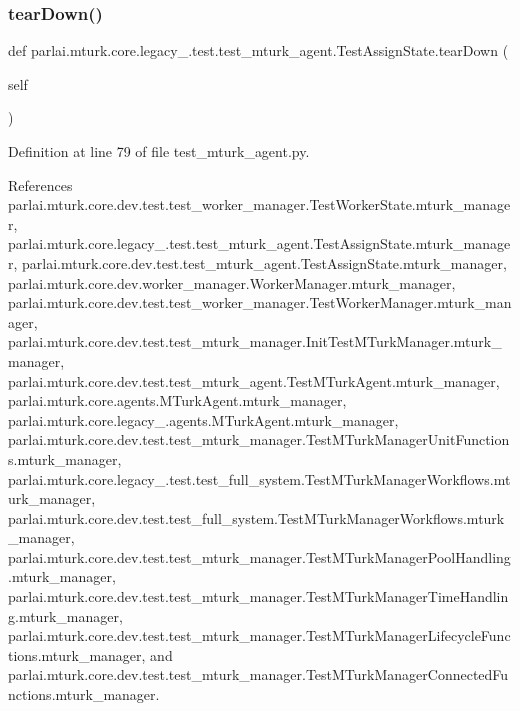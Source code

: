 \subsubsection{\texorpdfstring{tear\+Down()}{tearDown()}}
{\footnotesize\ttfamily def parlai.\+mturk.\+core.\+legacy\+\_.\+test.\+test\+\_\+mturk\+\_\+agent.\+Test\+Assign\+State.\+tear\+Down (\begin{DoxyParamCaption}\item[{}]{self }\end{DoxyParamCaption})}



Definition at line 79 of file test\+\_\+mturk\+\_\+agent.\+py.



References parlai.\+mturk.\+core.\+dev.\+test.\+test\+\_\+worker\+\_\+manager.\+Test\+Worker\+State.\+mturk\+\_\+manager, parlai.\+mturk.\+core.\+legacy\+\_.\+test.\+test\+\_\+mturk\+\_\+agent.\+Test\+Assign\+State.\+mturk\+\_\+manager, parlai.\+mturk.\+core.\+dev.\+test.\+test\+\_\+mturk\+\_\+agent.\+Test\+Assign\+State.\+mturk\+\_\+manager, parlai.\+mturk.\+core.\+dev.\+worker\+\_\+manager.\+Worker\+Manager.\+mturk\+\_\+manager, parlai.\+mturk.\+core.\+dev.\+test.\+test\+\_\+worker\+\_\+manager.\+Test\+Worker\+Manager.\+mturk\+\_\+manager, parlai.\+mturk.\+core.\+dev.\+test.\+test\+\_\+mturk\+\_\+manager.\+Init\+Test\+M\+Turk\+Manager.\+mturk\+\_\+manager, parlai.\+mturk.\+core.\+dev.\+test.\+test\+\_\+mturk\+\_\+agent.\+Test\+M\+Turk\+Agent.\+mturk\+\_\+manager, parlai.\+mturk.\+core.\+agents.\+M\+Turk\+Agent.\+mturk\+\_\+manager, parlai.\+mturk.\+core.\+legacy\+\_.\+agents.\+M\+Turk\+Agent.\+mturk\+\_\+manager, parlai.\+mturk.\+core.\+dev.\+test.\+test\+\_\+mturk\+\_\+manager.\+Test\+M\+Turk\+Manager\+Unit\+Functions.\+mturk\+\_\+manager, parlai.\+mturk.\+core.\+legacy\+\_.\+test.\+test\+\_\+full\+\_\+system.\+Test\+M\+Turk\+Manager\+Workflows.\+mturk\+\_\+manager, parlai.\+mturk.\+core.\+dev.\+test.\+test\+\_\+full\+\_\+system.\+Test\+M\+Turk\+Manager\+Workflows.\+mturk\+\_\+manager, parlai.\+mturk.\+core.\+dev.\+test.\+test\+\_\+mturk\+\_\+manager.\+Test\+M\+Turk\+Manager\+Pool\+Handling.\+mturk\+\_\+manager, parlai.\+mturk.\+core.\+dev.\+test.\+test\+\_\+mturk\+\_\+manager.\+Test\+M\+Turk\+Manager\+Time\+Handling.\+mturk\+\_\+manager, parlai.\+mturk.\+core.\+dev.\+test.\+test\+\_\+mturk\+\_\+manager.\+Test\+M\+Turk\+Manager\+Lifecycle\+Functions.\+mturk\+\_\+manager, and parlai.\+mturk.\+core.\+dev.\+test.\+test\+\_\+mturk\+\_\+manager.\+Test\+M\+Turk\+Manager\+Connected\+Functions.\+mturk\+\_\+manager.

